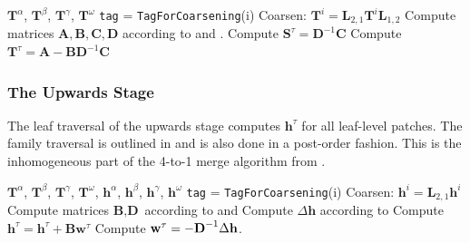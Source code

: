 \begin{algorithm}[h]
    \caption{\texttt{Merge4To1} Function (Build Stage Family Callback)}
    \begin{algorithmic}[0]
        \Require $\textbf{T}^{\alpha}$, $\textbf{T}^{\beta}$, $\textbf{T}^{\gamma}$, $\textbf{T}^{\omega}$
            \State \texttt{tag} = \texttt{TagForCoarsening}(i)
                \State Coarsen: $\textbf{T}^{i} = \textbf{L}_{2,1} \textbf{T}^{i} \textbf{L}_{1,2}$
            \EndIf
        \EndFor
        \State Compute matrices $\textbf{A}, \textbf{B}, \textbf{C}, \textbf{D}$ according to  and .
        \State Compute $\textbf{S}^{\tau} = \textbf{D}^{-1} \textbf{C}$
        \State Compute $\textbf{T}^{\tau} = \textbf{A} - \textbf{B} \textbf{D}^{-1} \textbf{C}$
    \end{algorithmic}
    \label{alg:build_merge}
\end{algorithm}

\subsubsection{The Upwards Stage}

The leaf traversal of the upwards stage computes $\textbf{h}^{\tau}$ for all leaf-level patches. The family traversal is outlined in  and is also done in a post-order fashion. This is the inhomogeneous part of the 4-to-1 merge algorithm from .

\begin{algorithm}[h]
    \caption{\texttt{Upwards4To1} Function (Upwards Stage Family Callback)}
    \begin{algorithmic}[0]
        \Require $\textbf{T}^{\alpha}$, $\textbf{T}^{\beta}$, $\textbf{T}^{\gamma}$, $\textbf{T}^{\omega}$, $\textbf{h}^{\alpha}$, $\textbf{h}^{\beta}$, $\textbf{h}^{\gamma}$, $\textbf{h}^{\omega}$
        \State \texttt{tag} = \texttt{TagForCoarsening}(i)
        \State Coarsen: $\textbf{h}^{i} = \textbf{L}_{2,1} \textbf{h}^{i}$
        \EndIf
        \EndFor
        \State Compute matrices $\textbf{B}, \textbf{D}$ according to  and 
        \State Compute $\Delta \textbf{h}$ according to 
        \State Compute $\textbf{h}^{\tau} = \textbf{h}^{\tau} + \textbf{B} \textbf{w}^{\tau}$
        \State Compute $\textbf{w}^{\tau} = -\textbf{D}^{-1} \Delta \mathbf h$.
    \end{algorithmic}
    \label{alg:upwards_merge}
\end{algorithm}

